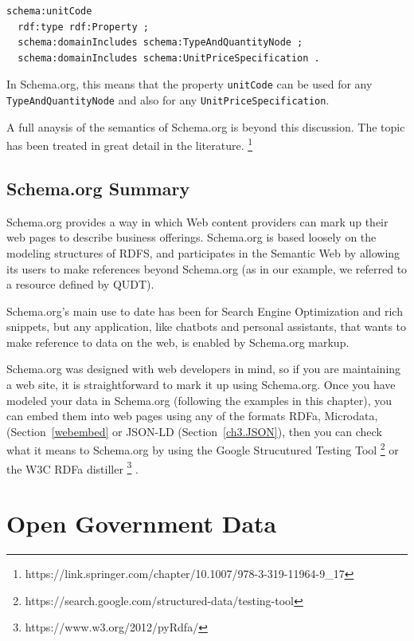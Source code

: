 \begin{lstlisting}
schema:unitCode
  rdf:type rdf:Property ;
  schema:domainIncludes schema:TypeAndQuantityNode ;
  schema:domainIncludes schema:UnitPriceSpecification .
\end{lstlisting}

In Schema.org, this means that the property \texttt{unitCode} can be used for any 
\texttt{TypeAndQuantityNode} and also for any \texttt{UnitPriceSpecification}.

A full anaysis of the semantics of Schema.org is beyond this discussion.  The topic has been treated in 
great detail in the literature. \footnote{https://link.springer.com/chapter/10.1007/978-3-319-11964-9\_17}

\subsection{Schema.org Summary}

Schema.org provides a way in which Web content
providers can mark up their web pages to describe business offerings.
Schema.org is based loosely on the modeling structures of RDFS, and participates
in the Semantic Web by allowing its users to make references beyond Schema.org 
(as in our example, we referred to a resource defined by QUDT). 

Schema.org's main use to date has been for Search Engine Optimization and 
rich snippets, but any application, like chatbots and personal assistants, that 
wants to make reference to data on the web, is enabled by Schema.org markup. 

Schema.org was designed with web developers in mind, so if you are maintaining 
a web site, it is straightforward to mark it up using Schema.org. 
Once you have modeled your data in Schema.org (following the examples
in this chapter), you can embed them into web pages
using any of the formats RDFa, Microdata, (Section~\ref{webembed} or 
JSON-LD (Section~\ref{ch3.JSON}), then you can check what it means to Schema.org
by using the Google Strucutured Testing Tool \footnote{https://search.google.com/structured-data/testing-tool} or the W3C RDFa distiller \footnote{https://www.w3.org/2012/pyRdfa/} .






\section{Open Government Data}

